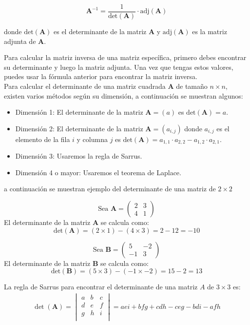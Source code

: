 \begin{}
\[
\boldsymbol{A}^{-1} = \frac{1}{{\text{{det}}(\boldsymbol{A})}} \cdot \text{{adj}}(\boldsymbol{A})
\]

donde $\text{{det}}(\boldsymbol{A})$ es el determinante de la matriz $\boldsymbol{A}$ y $\text{{adj}}(\boldsymbol{A})$ es la matriz adjunta de $\boldsymbol{A}$.

Para calcular la matriz inversa de una matriz específica, primero debes encontrar su determinante y luego la matriz adjunta. Una vez que tengas estos valores, puedes usar la fórmula anterior para encontrar la matriz inversa.\\
Para calcular el determinante de una matriz cuadrada $\boldsymbol{A}$ de tamaño $n \times n$, existen varios métodos  según su dimensión, a continuación se muestran algunos:
\begin{itemize}
\item {Dimensión 1:} El determinante de la matriz \( \boldsymbol{A} = (a) \) es \( \text{det}(\boldsymbol{A}) = a \).

\item {Dimensión 2:} El determinante de la matriz \( \boldsymbol{A} = (a_{i,j}) \) donde \( a_{i,j} \) es el elemento de la fila \( i \) y columna \( j \) es \( \text{det}(\boldsymbol{A}) = a_{1,1} \cdot a_{2,2} - a_{1,2} \cdot a_{2,1} \).

\item {Dimensión 3:} Usaremos la regla de Sarrus.

\item {Dimensión 4 o mayor:} Usaremos el teorema de Laplace.
\end{itemize}
a continuación se muestran ejemplo del determinante de una matriz de $2\times2$\\
\begin{example}
\[
\text{Sea } \boldsymbol{A} = \begin{pmatrix}
2 & 3 \\
4 & 1
\end{pmatrix}
\]
El determinante de la matriz \( \boldsymbol{A} \) se calcula como:
\[
\text{det}(\boldsymbol{A}) = (2 \times 1) - (4 \times 3) = 2 - 12 = -10
\]  
\end{example}
\begin{example}
\[
\text{Sea } \boldsymbol{B} = \begin{pmatrix}
5 & -2 \\
-1 & 3
\end{pmatrix}
\]
El determinante de la matriz \( \boldsymbol{B} \) se calcula como:
\[
\text{det}(\boldsymbol{B}) = (5 \times 3) - (-1 \times -2) = 15 - 2 = 13
\]
\end{example}
La regla de Sarrus para encontrar el determinante de una matriz \( A \) de \( 3 \times 3 \) es:
\begin{align}
\label{sarrus}
  \det(\boldsymbol{A}) = 
\begin{vmatrix}
a & b & c \\
d & e & f \\
g & h & i \\
\end{vmatrix}
= aei + bfg + cdh - ceg - bdi - afh  
\end{align}



\end{}
